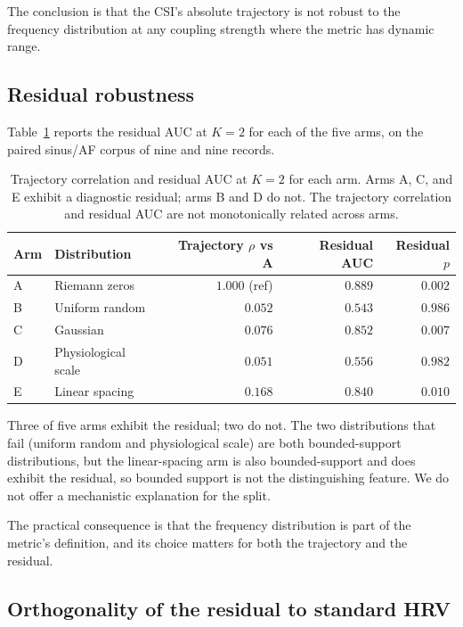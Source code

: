 \documentclass[11pt]{article}
\begin{document}
The conclusion is that the CSI's absolute trajectory is not robust to
the frequency distribution at any coupling strength where the metric
has dynamic range.

\subsection{Residual robustness}

Table~\ref{tab:residual-arms} reports the residual AUC at $K = 2$ for
each of the five arms, on the paired sinus/AF corpus of nine and nine
records.

\begin{table}[h]
\centering
\begin{tabular}{llrrr}
\toprule
Arm & Distribution & Trajectory $\rho$ vs A & Residual AUC & Residual $p$ \\
\midrule
A & Riemann zeros & $1.000$ (ref) & $\mathbf{0.889}$ & $0.002$ \\
B & Uniform random & $0.052$ & $0.543$ & $0.986$ \\
C & Gaussian & $0.076$ & $\mathbf{0.852}$ & $0.007$ \\
D & Physiological scale & $0.051$ & $0.556$ & $0.982$ \\
E & Linear spacing & $0.168$ & $\mathbf{0.840}$ & $0.010$ \\
\bottomrule
\end{tabular}
\caption{Trajectory correlation and residual AUC at $K = 2$ for each
arm. Arms A, C, and E exhibit a diagnostic residual; arms B and D do
not. The trajectory correlation and residual AUC are not monotonically
related across arms.}
\label{tab:residual-arms}
\end{table}

Three of five arms exhibit the residual; two do not. The two
distributions that fail (uniform random and physiological scale) are
both bounded-support distributions, but the linear-spacing arm is also
bounded-support and does exhibit the residual, so bounded support is
not the distinguishing feature. We do not offer a mechanistic
explanation for the split.

The practical consequence is that the frequency distribution is part of
the metric's definition, and its choice matters for both the trajectory
and the residual.

\subsection{Orthogonality of the residual to standard HRV}
\end{document}
